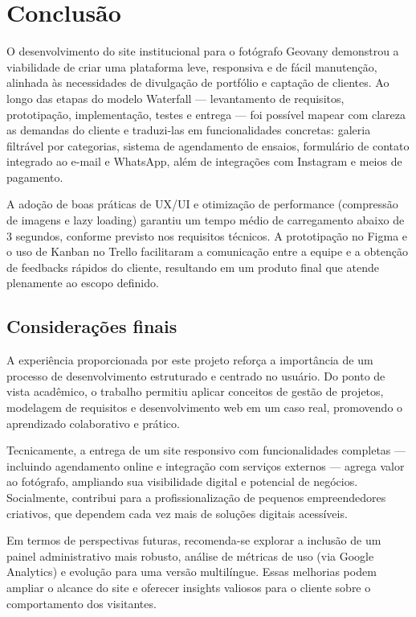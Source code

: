 \chapter{Conclusão}
\label{chap:conc}

O desenvolvimento do site institucional para o fotógrafo Geovany demonstrou a viabilidade de criar uma plataforma leve, responsiva e de fácil manutenção, alinhada às necessidades de divulgação de portfólio e captação de clientes. Ao longo das etapas do modelo Waterfall — levantamento de requisitos, prototipação, implementação, testes e entrega — foi possível mapear com clareza as demandas do cliente e traduzi-las em funcionalidades concretas: galeria filtrável por categorias, sistema de agendamento de ensaios, formulário de contato integrado ao e-mail e WhatsApp, além de integrações com Instagram e meios de pagamento.

A adoção de boas práticas de UX/UI e otimização de performance (compressão de imagens e lazy loading) garantiu um tempo médio de carregamento abaixo de 3 segundos, conforme previsto nos requisitos técnicos. A prototipação no Figma e o uso de Kanban no Trello facilitaram a comunicação entre a equipe e a obtenção de feedbacks rápidos do cliente, resultando em um produto final que atende plenamente ao escopo definido.



\section{Considerações finais}
\label{sec:consid}

A experiência proporcionada por este projeto reforça a importância de um processo de desenvolvimento estruturado e centrado no usuário. Do ponto de vista acadêmico, o trabalho permitiu aplicar conceitos de gestão de projetos, modelagem de requisitos e desenvolvimento web em um caso real, promovendo o aprendizado colaborativo e prático.  

Tecnicamente, a entrega de um site responsivo com funcionalidades completas — incluindo agendamento online e integração com serviços externos — agrega valor ao fotógrafo, ampliando sua visibilidade digital e potencial de negócios. Socialmente, contribui para a profissionalização de pequenos empreendedores criativos, que dependem cada vez mais de soluções digitais acessíveis.

Em termos de perspectivas futuras, recomenda-se explorar a inclusão de um painel administrativo mais robusto, análise de métricas de uso (via Google Analytics) e evolução para uma versão multilíngue. Essas melhorias podem ampliar o alcance do site e oferecer insights valiosos para o cliente sobre o comportamento dos visitantes.










